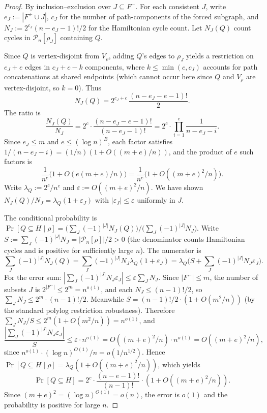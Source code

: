 \documentclass[11pt]{article}
\begin{document}
\begin{proof}
By inclusion--exclusion over $J \subseteq F^-$.  For each consistent
$J$, write $e_J := |F^+ \cup J|$, $c_J$ for the number of
path-components of the forced subgraph, and
$N_J := 2^{c_J}(n - e_J - 1)!/2$ for the Hamiltonian cycle count.
Let $N_J(Q)$ count cycles in $\mathcal{P}_n[\rho_J]$ containing $Q$.

Since $Q$ is vertex-disjoint from $V_\rho$, adding $Q$'s edges to
$\rho_J$ yields a restriction on $e_J + e$ edges in $c_J + c - k$
components, where $k \le \min(c, c_J)$ accounts for path concatenations
at shared endpoints (which cannot occur here since $Q$ and $V_\rho$ are
vertex-disjoint, so $k = 0$).  Thus
\[
N_J(Q) = 2^{c_J + c}\,\frac{(n - e_J - e - 1)!}{2}.
\]
The ratio is
\[
\frac{N_J(Q)}{N_J}
= 2^c \cdot \frac{(n - e_J - e - 1)!}{(n - e_J - 1)!}
= 2^c \cdot \prod_{i=1}^{e} \frac{1}{n - e_J - i}.
\]
Since $e_J \le m$ and $e \le (\log n)^B$, each factor satisfies
$1/(n - e_J - i) = (1/n)(1 + O((m+e)/n))$, and the product of $e$
such factors is
\[
\frac{1}{n^e}\bigl(1 + O(e(m+e)/n)\bigr)
= \frac{1}{n^e}\bigl(1 + O((m+e)^2/n)\bigr).
\]
Write $\lambda_Q := 2^c / n^e$ and $\varepsilon :=
O((m+e)^2/n)$.  We have shown
$N_J(Q)/N_J = \lambda_Q(1 + \varepsilon_J)$ with
$|\varepsilon_J| \le \varepsilon$ uniformly in $J$.

The conditional probability is
$\Pr[Q \subseteq H \mid \rho]
= \bigl(\sum_{J} (-1)^{|J|} N_J(Q)\bigr)
  \big/ \bigl(\sum_{J} (-1)^{|J|} N_J\bigr)$.
Write $S := \sum_J (-1)^{|J|} N_J = |\mathcal{P}_n[\rho]|/2 > 0$
(the denominator counts Hamiltonian cycles and is positive for
sufficiently large $n$).  The numerator is
\[
\textstyle
\sum_J (-1)^{|J|} N_J(Q)
= \sum_J (-1)^{|J|} N_J \lambda_Q(1 + \varepsilon_J)
= \lambda_Q \bigl(S + \sum_J (-1)^{|J|} N_J \varepsilon_J\bigr).
\]
For the error sum: $|\sum_J (-1)^{|J|} N_J \varepsilon_J|
\le \varepsilon \sum_J N_J$.  Since $|F^-| \le m$, the number of
subsets $J$ is $2^{|F^-|} \le 2^m = n^{o(1)}$, and each $N_J \le
(n-1)!/2$, so $\sum_J N_J \le 2^m \cdot (n-1)!/2$.  Meanwhile
$S = (n-1)!/2 \cdot (1 + O(m^2/n))$ (by the standard polylog
restriction robustness).  Therefore
$\sum_J N_J / S \le 2^m (1 + O(m^2/n)) = n^{o(1)}$, and
\[
\frac{|\sum_J (-1)^{|J|} N_J \varepsilon_J|}{S}
\le \varepsilon \cdot n^{o(1)}
= O((m+e)^2/n) \cdot n^{o(1)}
= O((m+e)^2/n),
\]
since $n^{o(1)} \cdot (\log n)^{O(1)}/n = o(1/n^{1/2})$.
Hence $\Pr[Q \subseteq H \mid \rho]
= \lambda_Q(1 + O((m+e)^2/n))$, which yields
\[
\Pr[Q \subseteq H]
= 2^c \cdot \frac{(n-e-1)!}{(n-1)!} \cdot (1 + O((m+e)^2/n)).
\]
Since $(m + e)^2 = (\log n)^{O(1)} = o(n)$, the error is $o(1)$ and the
probability is positive for large $n$.
\end{proof}
\end{document}
